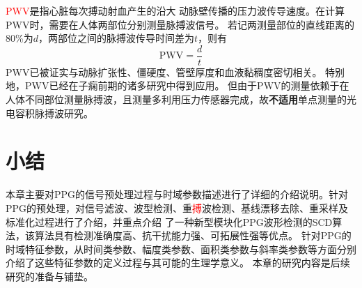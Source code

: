 \textcolor{red}{PWV}是指心脏每次搏动射血产生的沿大
动脉壁传播的压力波传导速度\cite{Van2012}。在计算PWV时，需要在人体两部位分别测量脉搏波信号。
若记两测量部位的直线距离的80\%为$d$，两部位之间的脉搏波传导时间差为$t$，则有
\begin{equation}
    \label{equ:pwv}
    \text{PWV} = \frac{d}{t}
\end{equation}
PWV已被证实与动脉扩张性、僵硬度、管壁厚度和血液黏稠度密切相关。
特别地，PWV已经在子痫前期的诸多研究中得到应用\cite{Tomsin2012,Katsipi2014,VivianaIvan2018,Ira2014}。
但由于PWV的测量依赖于在人体不同部位测量脉搏波，且测量多利用压力传感器完成，故\textbf{不适用}单点测量的光电容积脉搏波研究。

\section{小结}
本章主要对PPG的信号预处理过程与时域参数描述进行了详细的介绍说明。针对PPG的预处理，对信号滤波、波型检测、重\textcolor{red}{搏}波检测、基线漂移去除、重采样及标准化过程进行了介绍，并重点介绍
了一种新型模块化PPG波形检测的SCD算法，该算法具有检测准确度高、抗干扰能力强、可拓展性强等优点。
针对PPG的时域特征参数，从时间类参数、幅度类参数、面积类参数与斜率类参数等方面分别介绍了这些特征参数的定义过程与其可能的生理学意义。
本章的研究内容是后续研究的准备与铺垫。